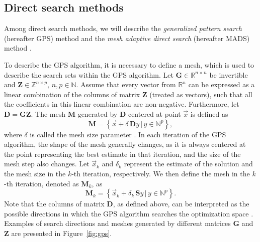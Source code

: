 \subsection{Direct search methods}\label{direct-search}
Among direct search methods, we will describe the \textit{generalized pattern search} (hereafter GPS) method \cite{Audet2002} and the \textit{mesh adaptive direct search} (hereafter MADS) method \cite{Audet2006}.

To describe the GPS algorithm, it is necessary to define a mesh, which is used to describe the search sets within the GPS algorithm. Let $ \mathbf{G} \in \mathbb{R}^{n \times n} $ be invertible and $ \mathbf{Z} \in \mathbb{Z}^{n \times p} $, $n, p \in \mathbb{N}$. Assume that every vector from $ \mathbb{R}^{n} $ can be expressed as a linear combination of the columns of matrix $ \mathbf{Z} $ (treated as vectors), such that all the coefficients in this linear combination are non-negative. Furthermore, let $ \mathbf{D} = \mathbf{G} \mathbf{Z} $. The mesh $ \mathbf{M} $ generated by $ \mathbf{D} $ centered at point $ \vec{x} $ is defined as
\begin{equation}
	\mathbf{M} = \left\{ \vec{x} + \delta \, \mathbf{D} y \, | \, y \in \mathbb{N}^p \right\},
\end{equation}
where $ \delta $ is called the mesh size parameter \cite{BBO-textbook, Audet2002}. In each iteration of the GPS algorithm, the shape of the mesh generally changes, as it is always centered at the point representing the best estimate in that iteration, and the size of the mesh step also changes. Let $ \vec{x}_k $ and $ \delta_k $ represent the estimate of the solution and the mesh size in the $ k $-th iteration, respectively. We 
then define the mesh in the $ k $-th iteration, denoted as $ \mathbf{M} _k $, as
\begin{equation}
	\mathbf{M} _k = \left\{ \vec{x}_k + \delta_k \, \mathbf{S} y \, | \, y \in \mathbb{N}^p \right\}.
\end{equation}
Note that the columns of matrix $ \mathbf{D} $, as defined above, can be interpreted as the possible directions in which the GPS algorithm searches the optimization space \cite{BBO-textbook, Audet2002}. Examples of search directions and meshes generated by different matrices $\mathbf{G}$ and $\mathbf{Z}$ are presented in Figure~\ref{fig:gps}.


